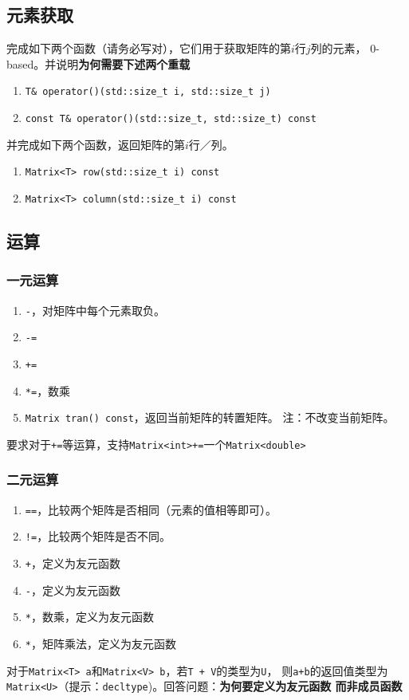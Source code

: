 \documentclass[12pt, a4paper]{article}
\newcommand{\ilc}{\texttt}
\begin{document}
\subsection{元素获取}
  完成如下两个函数（请务必写对），它们用于获取矩阵的第$i$行$j$列的元素，
  $0$-based。并说明\textbf{为何需要下述两个重载}
  \begin{enumerate}
    \item \ilc{T\& operator()(std::size\_t i, std::size\_t j)}
    \item \ilc{const T\& operator()(std::size\_t, std::size\_t) const}
  \end{enumerate}
  并完成如下两个函数，返回矩阵的第$i$行／列。
  \begin{enumerate}
    \item \ilc{Matrix<T> row(std::size\_t i) const}
    \item \ilc{Matrix<T> column(std::size\_t i) const}
  \end{enumerate}

\subsection{运算}
  \subsubsection{一元运算}
    \begin{enumerate}
      \item \ilc{-}，对矩阵中每个元素取负。
      \item \ilc{-=}
      \item \ilc{+=}
      \item \ilc{*=}，数乘
      \item \ilc{Matrix tran() const}，返回当前矩阵的转置矩阵。
      注：不改变当前矩阵。
    \end{enumerate}
    要求对于\ilc{+=}等运算，支持\ilc{Matrix<int>+=}一个\ilc{Matrix<double>}

  \subsubsection{二元运算}
  \begin{enumerate}
    \item \ilc{==}，比较两个矩阵是否相同（元素的值相等即可）。
    \item \ilc{!=}，比较两个矩阵是否不同。
    \item \ilc{+}，定义为友元函数
    \item \ilc{-}，定义为友元函数
    \item \ilc{*}，数乘，定义为友元函数
    \item \ilc{*}，矩阵乘法，定义为友元函数
  \end{enumerate}
  对于\ilc{Matrix<T> a}和\ilc{Matrix<V> b}，若\ilc{T + V}的类型为\ilc{U}，
  则\ilc{a+b}的返回值类型为\ilc{Matrix<U>}（提示：\ilc{decltype})。回答问题：\textbf{为何要定义为友元函数
  而非成员函数}
\end{document}
